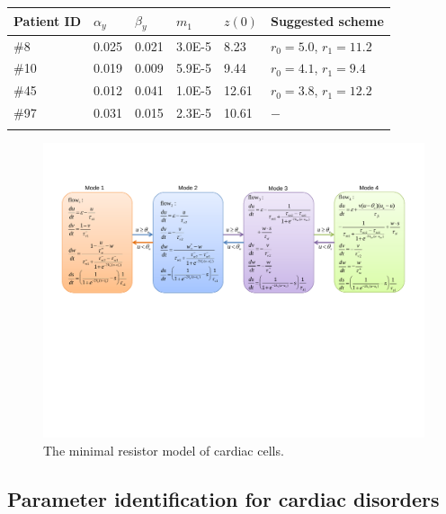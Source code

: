 \begin{table}[htb]
{\begin{tabular}{llllll}\toprule
Patient ID  & $\alpha_y$  & $\beta_y$ & $m_1$ & $z(0)$ & Suggested scheme  \\\midrule
\#8 & 0.025 & 0.021  & 3.0E-5 & 8.23 & $r_0=5.0$, $r_1=11.2$ \\
\#10 & 0.019 & 0.009  & 5.9E-5 & 9.44 & $r_0=4.1$, $r_1=9.4$ \\
\#45 & 0.012  & 0.041  & 1.0E-5 & 12.61 & $r_0=3.8$, $r_1=12.2$ \\
\#97 & 0.031  & 0.015  & 2.3E-5 & 10.61 & $-$ \\
\botrule
\end{tabular}}{}
 \vspace{-0.7cm}
\end{table}

\begin{figure}[t]
\centering
\includegraphics[scale=0.65]{fig-cardiac}
\caption{The minimal resistor model of cardiac cells.}
\label{mrm}
 \vspace{-0.7cm}
\end{figure}


\subsection{Parameter identification for cardiac disorders}

